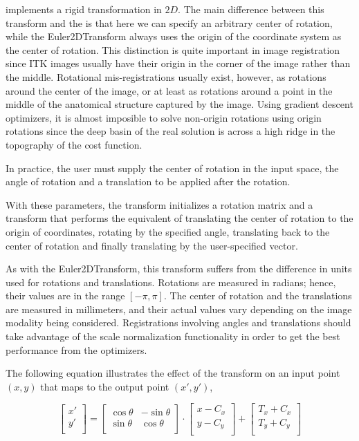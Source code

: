  implements a rigid transformation in $2D$. 
The main difference between this transform and the 
is that here we can specify an arbitrary center of rotation, while the
Euler2DTransform always uses the origin of the coordinate system as
the center of rotation. This distinction is quite important in image
registration since ITK images usually have their origin in the corner of the
image rather than the middle.  Rotational mis-registrations usually
exist, however, as rotations around the center of the image, or at least as rotations
around a point in the middle of the anatomical structure captured by the
image. Using gradient descent optimizers, it is almost imposible to solve
non-origin rotations using origin rotations since the deep basin of the real
solution is across a high ridge in the topography of the cost function.

In practice, the user must supply the center of
rotation in the input space, the angle of rotation and a translation to be
applied after the rotation.

With these parameters, the transform initializes a rotation matrix and a
transform that performs the equivalent of translating the center of
rotation to the origin of coordinates, rotating by the specified angle,
translating back to the center of rotation and finally translating by the
user-specified vector.

As with the Euler2DTransform, this transform suffers from the
difference in units used for rotations and translations. Rotations are
measured in radians; hence, their values are in the range $[-\pi,\pi]$. The
center of rotation and the translations are measured in millimeters, and their
actual values vary depending on the image modality being considered.
Registrations involving angles and translations should take advantage of the
scale normalization functionality in order to get the best performance from 
the optimizers.

The following equation illustrates the effect of the transform on an input
point $(x,y)$ that maps to the output point $(x',y')$,

\begin{equation}
\left[ 
\begin{array}{c}
x' \\
y' \\
\end{array}
\right]
=
\left[ 
\begin{array}{cc}
\cos{\theta} & -\sin{\theta} \\
\sin{\theta} &  \cos{\theta} \\
\end{array}
\right]
\cdot
\left[ 
\begin{array}{c}
x - C_x \\
y - C_y \\
\end{array}
\right]
+ 
\left[ 
\begin{array}{c}
T_x + C_x \\
T_y + C_y \\
\end{array}
\right]
\end{equation}

